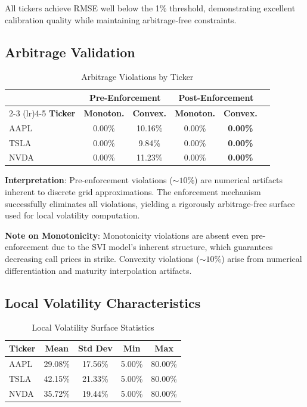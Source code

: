 \documentclass[12pt,a4paper]{article}
\begin{document}
All tickers achieve RMSE well below the 1\% threshold, demonstrating excellent calibration quality while maintaining arbitrage-free constraints.

\subsection{Arbitrage Validation}

\begin{table}[h]
\centering
\caption{Arbitrage Violations by Ticker}
\begin{tabular}{lccccc}
\toprule
 & \multicolumn{2}{c}{\textbf{Pre-Enforcement}} & \multicolumn{2}{c}{\textbf{Post-Enforcement}} \\
\cmidrule(lr){2-3} \cmidrule(lr){4-5}
\textbf{Ticker} & \textbf{Monoton.} & \textbf{Convex.} & \textbf{Monoton.} & \textbf{Convex.} \\
\midrule
AAPL & 0.00\% & 10.16\% & 0.00\% & \textbf{0.00\%} \\
TSLA & 0.00\% & 9.84\% & 0.00\% & \textbf{0.00\%} \\
NVDA & 0.00\% & 11.23\% & 0.00\% & \textbf{0.00\%} \\
\bottomrule
\end{tabular}
\end{table}

\textbf{Interpretation}: Pre-enforcement violations ($\sim10\%$) are numerical artifacts inherent to discrete grid approximations. The enforcement mechanism successfully eliminates all violations, yielding a rigorously arbitrage-free surface used for local volatility computation.

\textbf{Note on Monotonicity}: Monotonicity violations are absent even pre-enforcement due to the SVI model's inherent structure, which guarantees decreasing call prices in strike. Convexity violations ($\sim10\%$) arise from numerical differentiation and maturity interpolation artifacts.

\subsection{Local Volatility Characteristics}

\begin{table}[h]
\centering
\caption{Local Volatility Surface Statistics}
\begin{tabular}{lcccc}
\toprule
\textbf{Ticker} & \textbf{Mean} & \textbf{Std Dev} & \textbf{Min} & \textbf{Max} \\
\midrule
AAPL & 29.08\% & 17.56\% & 5.00\% & 80.00\% \\
TSLA & 42.15\% & 21.33\% & 5.00\% & 80.00\% \\
NVDA & 35.72\% & 19.44\% & 5.00\% & 80.00\% \\
\bottomrule
\end{tabular}
\end{table}
\end{document}
